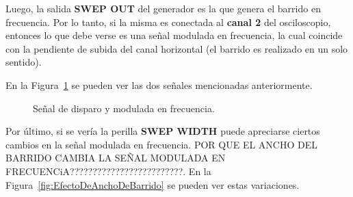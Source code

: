    Luego, la salida \textbf{SWEP OUT} del generador es la que genera el barrido en frecuencia. Por lo tanto, si la misma
    es conectada al \textbf{canal 2} del osciloscopio, entonces lo que debe verse es una señal modulada en frecuencia, la cual
    coincide con la pendiente de subida del canal horizontal (el barrido es realizado en un solo sentido). 

    En la Figura~\ref{fig:SeñalDisparoySeñalFM} se pueden ver las dos señales mencionadas anteriormente.

    \begin{figure}[H]
      \centering
      \caption{Señal de disparo y modulada en frecuencia.}
      \label{fig:SeñalDisparoySeñalFM}
    \end{figure}

    Por último, si se vería la perilla \textbf{SWEP WIDTH} puede apreciarse ciertos cambios en la señal modulada en frecuencia.
    POR QUE EL ANCHO DEL BARRIDO CAMBIA LA SEÑAL MODULADA EN FRECUENCiA?????????????????????????. En la 
    Figura~\ref{fig:EfectoDeAnchoDeBarrido} se pueden ver estas variaciones.


